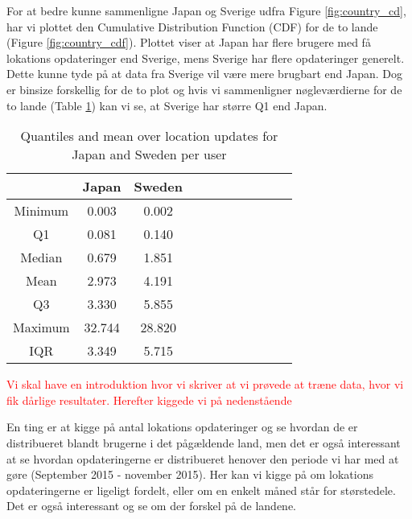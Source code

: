 For at bedre kunne sammenligne Japan og Sverige udfra Figure \ref{fig:country_cd}, har vi plottet den Cumulative Distribution Function (CDF) for de to lande (Figure \ref{fig:country_cdf}). Plottet viser at Japan har flere brugere med få lokations opdateringer end Sverige, mens Sverige har flere opdateringer generelt. Dette kunne tyde på at data fra  Sverige vil være mere brugbart end Japan. Dog er binsize forskellig for de to plot og hvis vi sammenligner nøgleværdierne for de to lande (Table \ref{tab:stat_loc_updates}) kan vi se, at Sverige har større Q1 end Japan.

\begin{table}[htbp]
        \centering
        \small
        \setlength\tabcolsep{2pt}
        \begin{tabular}{|c|c|c|c|c|c|c|c|c|c|c|}
            \hline
                         & Japan      &   Sweden      \\[-3pt]
            \hline
                 Minimum &    0.003       &   0.002          \\
            \hline
                 Q1      &  0.081     &   0.140      \\
            \hline
                 Median  & 0.679     &   1.851      \\
            \hline
                 Mean    &  2.973   &  4.191     \\
            \hline
                 Q3      & 3.330    &   5.855     \\
            \hline
                 Maximum &  32.744 &  28.820     \\
            \hline
                 IQR     &  3.349   &  5.715      \\
            \hline
            
        \end{tabular}
        \caption{Quantiles and mean over location updates for Japan and Sweden per user} %
        \label{tab:stat_loc_updates}
\end{table}

\textcolor{red}{Vi skal have en introduktion hvor vi skriver at vi prøvede at træne data, hvor vi fik dårlige resultater. Herefter kiggede vi på nedenstående}

En ting er at kigge på antal lokations opdateringer og se hvordan de er distribueret blandt brugerne i det pågældende land, men det er også interessant at se hvordan opdateringerne er distribueret henover den periode vi har med at gøre (September 2015 - november 2015). Her kan vi kigge på om lokations opdateringerne er ligeligt fordelt, eller om en enkelt måned står for størstedele. Det er også interessant og se om der forskel på de landene. 

